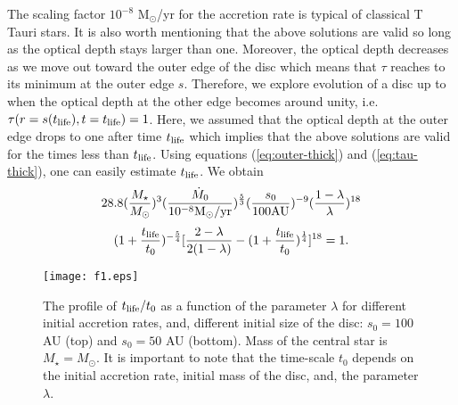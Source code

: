 \documentclass[apj]{emulateapj}
\begin{document}
The scaling factor $10^{-8}$ M$_{\odot}$/yr for the accretion rate is typical of classical T Tauri stars. 
It is also worth mentioning  that the above solutions are valid so long as the optical depth stays larger than one. Moreover, the optical depth decreases as we move out toward the outer edge of the disc which means that $\tau$ reaches to its minimum at the outer edge $s$. Therefore, we explore evolution of a disc up to when the optical depth at the other edge becomes around unity, i.e. $\tau (r=s(t_{\rm life}), t=t_{\rm life}) =1$. Here, we assumed that the optical depth at the outer edge drops to one after time $t_{\rm life}$ which implies that the above solutions are valid for the times less than $t_{\rm life}$. Using equations (\ref{eq:outer-thick}) and (\ref{eq:tau-thick}), one can easily estimate $t_{\rm life}$. We obtain
%
\begin{displaymath}
28.8 (\frac{M_{\star}}{M_{\odot}})^{3} (\frac{\dot{M}_0}{10^{-8} {\rm M}_{\odot}/{\rm yr}} )^{\frac{5}{3}} (\frac{s_0}{100 {\rm AU}})^{-9} (\frac{1-\lambda}{\lambda})^{18}
\end{displaymath}
%
%
\begin{equation}\label{eq:thick-valid}
(1+\frac{t_{\rm life}}{t_0})^{-\frac{5}{4}} [\frac{2-\lambda}{2(1-\lambda)}-(1+\frac{t_{\rm life}}{t_0})^{\frac{1}{4}}]^{18}=1.
\end{equation}
%
%
\begin{figure}
\texttt{[image: f1.eps]}
\caption{The profile of $t_{\rm life}/t_0$ as a function of the parameter $\lambda$ for different initial accretion rates, and, different initial size of the disc: $s_0 = 100$ AU (top) and $s_0 =50$ AU (bottom). Mass of the central star is $M_{\star}=M_{\odot}$. It is important to note that the time-scale $t_0$ depends on the initial accretion rate, initial mass of the disc, and, the parameter $\lambda$. }\label{fig:f1}
\end{figure}
%
%
\end{document}
